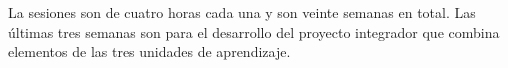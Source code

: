 La sesiones son de cuatro horas cada una y son veinte semanas en
total. Las \'{u}ltimas tres semanas son para el desarrollo del
proyecto integrador que combina elementos de las tres unidades de
aprendizaje.

